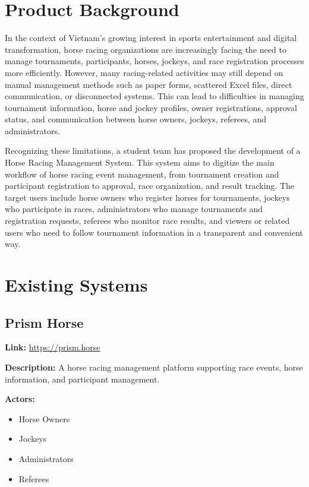 \section{Product Background}

In the context of Vietnam's growing interest in sports entertainment and digital transformation, horse racing organizations are increasingly facing the need to manage tournaments, participants, horses, jockeys, and race registration processes more efficiently. However, many racing-related activities may still depend on manual management methods such as paper forms, scattered Excel files, direct communication, or disconnected systems. This can lead to difficulties in managing tournament information, horse and jockey profiles, owner registrations, approval status, and communication between horse owners, jockeys, referees, and administrators.

Recognizing these limitations, a student team has proposed the development of a Horse Racing Management System. This system aims to digitize the main workflow of horse racing event management, from tournament creation and participant registration to approval, race organization, and result tracking. The target users include horse owners who register horses for tournaments, jockeys who participate in races, administrators who manage tournaments and registration requests, referees who monitor race results, and viewers or related users who need to follow tournament information in a transparent and convenient way.


\section{Existing Systems}

\subsection{Prism Horse}

\textbf{Link:} \url{https://prism.horse}

\textbf{Description:} A horse racing management platform supporting race events, horse information, and participant management.

\textbf{Actors:}
\begin{itemize}
    \item Horse Owners
    \item Jockeys
    \item Administrators
    \item Referees
\end{itemize}

